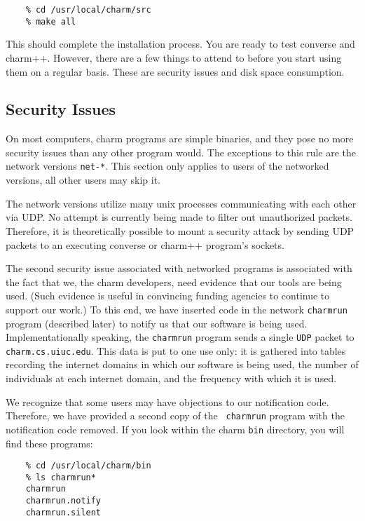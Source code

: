 \begin{verbatim}
    % cd /usr/local/charm/src
    % make all
\end{verbatim}

This should complete the installation process.  You are ready to test
converse and charm++.  However, there are a few things to
attend to before you start using them on a regular basis.  These are
security issues and disk space consumption.

\subsection{Security Issues}

On most computers, charm programs are simple binaries, and they pose
no more security issues than any other program would.  The exceptions
to this rule are the network versions {\tt net-*}.  
This section only applies to users
of the networked versions, all other users may skip it.

The network versions utilize many unix processes communicating with
each other via UDP.  No attempt is currently being made to filter out
unauthorized packets.  Therefore, it is theoretically possible to
mount a security attack by sending UDP packets to an executing
converse or charm++ program's sockets.

The second security issue associated with networked programs is
associated with the fact that we, the charm developers, need evidence
that our tools are being used.  (Such evidence is useful in convincing
funding agencies to continue to support our work.)  To this end, we
have inserted code in the network {\tt charmrun} program (described
later) to notify us that our software is being used.
Implementationally speaking, the {\tt charmrun} program sends a
single {\tt UDP} packet to {\tt charm.cs.uiuc.edu}.  This data is put
to one use only: it is gathered into tables recording the internet
domains in which our software is being used, the number of individuals
at each internet domain, and the frequency with which it is used.

We recognize that some users may have objections to our notification
code.  Therefore, we have provided a second copy of the {\tt
charmrun} program with the notification code removed.  If you look
within the charm {\tt bin} directory, you will find these programs:

\begin{verbatim}
    % cd /usr/local/charm/bin
    % ls charmrun*
    charmrun
    charmrun.notify
    charmrun.silent
\end{verbatim}


